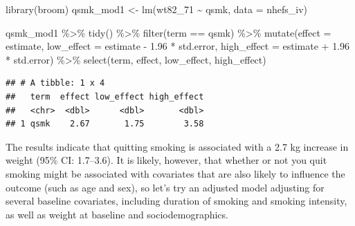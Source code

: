 \documentclass[
]{book}
\newenvironment{Shaded}{\begin{snugshade}}{\end{snugshade}}
\newcommand{\AttributeTok}[1]{\textcolor[rgb]{0.77,0.63,0.00}{#1}}
\newcommand{\FloatTok}[1]{\textcolor[rgb]{0.00,0.00,0.81}{#1}}
\newcommand{\FunctionTok}[1]{\textcolor[rgb]{0.00,0.00,0.00}{#1}}
\newcommand{\NormalTok}[1]{#1}
\newcommand{\OtherTok}[1]{\textcolor[rgb]{0.56,0.35,0.01}{#1}}
\newcommand{\SpecialCharTok}[1]{\textcolor[rgb]{0.00,0.00,0.00}{#1}}
\newcommand{\StringTok}[1]{\textcolor[rgb]{0.31,0.60,0.02}{#1}}
\begin{document}
\begin{Shaded}
\begin{Highlighting}[]
\FunctionTok{library}\NormalTok{(broom)}
\NormalTok{qsmk\_mod1 }\OtherTok{\textless{}{-}} \FunctionTok{lm}\NormalTok{(wt82\_71 }\SpecialCharTok{\textasciitilde{}}\NormalTok{ qsmk, }\AttributeTok{data =}\NormalTok{ nhefs\_iv)}

\NormalTok{qsmk\_mod1 }\SpecialCharTok{\%\textgreater{}\%} 
  \FunctionTok{tidy}\NormalTok{() }\SpecialCharTok{\%\textgreater{}\%} 
  \FunctionTok{filter}\NormalTok{(term }\SpecialCharTok{==} \StringTok{\textquotesingle{}qsmk\textquotesingle{}}\NormalTok{) }\SpecialCharTok{\%\textgreater{}\%}
  \FunctionTok{mutate}\NormalTok{(}\AttributeTok{effect =}\NormalTok{ estimate,}
         \AttributeTok{low\_effect =}\NormalTok{ estimate }\SpecialCharTok{{-}} \FloatTok{1.96} \SpecialCharTok{*}\NormalTok{ std.error, }
         \AttributeTok{high\_effect =}\NormalTok{ estimate }\SpecialCharTok{+} \FloatTok{1.96} \SpecialCharTok{*}\NormalTok{ std.error) }\SpecialCharTok{\%\textgreater{}\%} 
  \FunctionTok{select}\NormalTok{(term, effect, low\_effect, high\_effect)}
\end{Highlighting}
\end{Shaded}

\begin{verbatim}
## # A tibble: 1 x 4
##   term  effect low_effect high_effect
##   <chr>  <dbl>      <dbl>       <dbl>
## 1 qsmk    2.67       1.75        3.58
\end{verbatim}

The results indicate that quitting smoking is associated with a 2.7 kg increase in weight (95\% CI: 1.7--3.6). It is likely, however, that whether or not you quit smoking might be associated with covariates that are also likely to influence the outcome (such as age and sex), so let's try an adjusted model adjusting for several baseline covariates, including duration of smoking and smoking intensity, as well as weight at baseline and sociodemographics.
\end{document}
